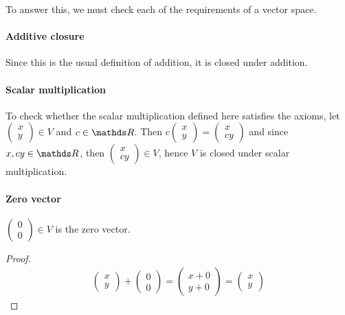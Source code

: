 \documentclass[11pt]{article}
\begin{document}
To answer this, we must check each of the requirements of a vector space.

\paragraph{Additive closure} Since this is the usual definition of addition, it is closed under addition.

\paragraph{Scalar multiplication} To check whether the scalar multiplication defined here satisfies the axioms, let $\begin{pmatrix}x \\ y \end{pmatrix} \in V$ and $c \in \bbR$. Then $c \begin{pmatrix}x \\ y\end{pmatrix} = \begin{pmatrix}x \\ cy\end{pmatrix}$ and since $x, cy \in \bbR$, then $\begin{pmatrix}x \\ cy\end{pmatrix} \in V$, hence $V$ is closed under scalar multiplication.

\paragraph{Zero vector}
\begin{claim}
$\begin{pmatrix}0 \\ 0\end{pmatrix} \in V$ is the zero vector.
\end{claim}
\begin{proof}
\begin{align*}
\begin{pmatrix}x \\ y\end{pmatrix} + \begin{pmatrix}0 \\ 0\end{pmatrix} = \begin{pmatrix}x + 0 \\ y + 0\end{pmatrix} = \begin{pmatrix}x \\ y\end{pmatrix}
\end{align*}
\end{proof}
\end{document}
